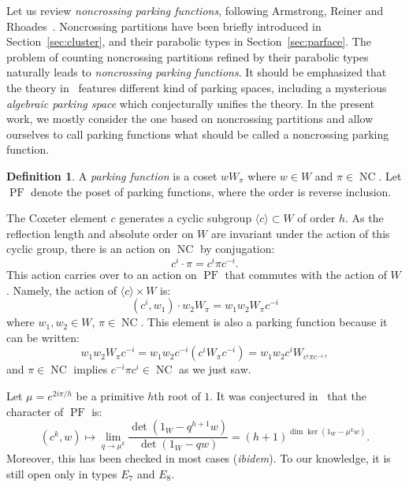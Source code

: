 \documentclass[11pt]{article}
\theoremstyle{definition}
\newtheorem{defi}[theo]{Definition}
\DeclareMathOperator{\PF}{PF}
\DeclareMathOperator{\NC}{NC}
\begin{document}
Let us review {\it noncrossing parking functions}, following Armstrong, Reiner and Rhoades~\cite{armstrongreinerrhoades}.  Noncrossing partitions have been briefly introduced in Section~\ref{sec:cluster}, and their parabolic types in Section~\ref{sec:parface}.  The problem of counting noncrossing partitions refined by their parabolic types naturally leads to {\it noncrossing parking functions}.  It should be emphasized that the theory in~\cite{armstrongreinerrhoades} features different kind of parking spaces, including a mysterious {\it algebraic parking space} which conjecturally unifies the theory.  In the present work, we mostly consider the one based on noncrossing partitions and allow ourselves to call parking functions what should be called a noncrossing parking function.

\begin{defi}
    A {\it parking function} is a coset $wW_\pi$ where $w\in W$ and $\pi\in \NC$.  Let $\PF$ denote the poset of parking functions, where the order is reverse inclusion.
\end{defi}

The Coxeter element $c$ generates a cyclic subgroup $\langle c \rangle \subset W$ of order $h$.  As the reflection length and absolute order on $W$ are invariant under the action of this cyclic group, there is an action on $\NC$ by conjugation:
\[
    c^i \cdot \pi = c^{i}\pi c^{-i}.
\]
This action carries over to an action on $\PF$ that commutes with the action of $W$.  Namely, the action of $\langle c \rangle \times W$ is:
\[
    (c^i, w_1) \cdot w_2W_{\pi} = w_1 w_2 W_{\pi}c^{-i}
\]
where $w_1, w_2 \in W$, $\pi\in \NC$.  This element is also a parking function because it can be written:
\[
    w_1 w_2 W_{\pi}c^{-i} = w_1 w_2 c^{-i} (c^{i} W_{\pi}c^{-i}) = w_1 w_2 c^i W_{ c^{i} \pi c^{-i}}, 
\]
and $\pi\in\NC$ implies $c^{-i} \pi c^i \in \NC$ as we just saw. 


Let $\mu = e^{ 2i\pi/ h}$ be a primitive $h$th root of $1$.  It was conjectured in~\cite{armstrongreinerrhoades} that the character of $\PF$ is:
\[
    (c^k, w ) \mapsto \lim_{q \to \mu^k} \frac{\det(1_W - q^{h+1} w)}{\det(1_W -q w) }
    =
    (h+1)^{\dim\ker(1_W - \mu^k  w)}.
\]
Moreover, this has been checked in most cases ({\it ibidem}).  To our knowledge, it is still open only in types $E_7$ and $E_8$.
\end{document}
